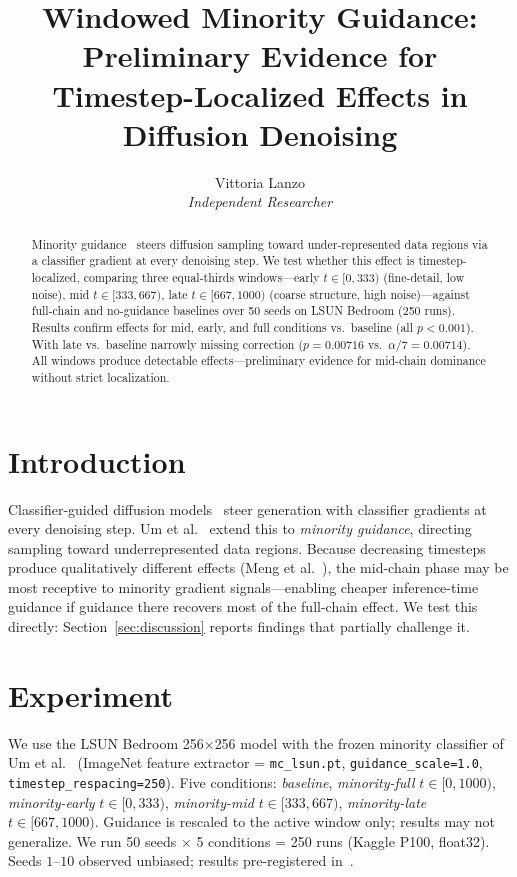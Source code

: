 \documentclass[10pt]{article}
\title{\textbf{Windowed Minority Guidance: Preliminary Evidence for
Timestep-Localized Effects in Diffusion Denoising}}
\author{%
  Vittoria Lanzo \\
  \textit{Independent Researcher}
}
\date{}
\begin{document}
\maketitle

\begin{abstract}
Minority guidance~\cite{um2024minority} steers diffusion sampling toward
under-represented data regions via a classifier gradient at every denoising
step.  We test whether this effect is timestep-localized, comparing three
equal-thirds windows---early $t\!\in\![0,333)$ (fine-detail, low noise),
mid $t\!\in\![333,667)$, late $t\!\in\![667,1000)$ (coarse structure, high
noise)---against full-chain and no-guidance baselines
over 50 seeds on LSUN Bedroom (250 runs).  Results confirm effects for mid,
early, and full conditions vs.\ baseline (all $p < 0.001$).  With late
vs.\ baseline narrowly missing correction ($p = 0.00716$ vs.\
$\alpha/7 = 0.00714$).  All windows produce detectable effects---preliminary
evidence for mid-chain dominance without strict localization.
\end{abstract}

\section{Introduction}
\label{sec:intro}

Classifier-guided diffusion models~\cite{dhariwal2021diffusion} steer generation
with classifier gradients at every denoising step.  Um et al.\ \cite{um2024minority}
extend this to \emph{minority guidance}, directing sampling toward underrepresented
data regions.  Because decreasing timesteps produce qualitatively different effects
(Meng et al.\ \cite{meng2022sdedit}), the mid-chain phase may be most receptive to
minority gradient signals---enabling cheaper inference-time guidance if guidance
there recovers most of the full-chain effect.  We test this directly: Section~\ref{sec:discussion}
reports findings that partially challenge it.

\section{Experiment}
\label{sec:experiment}

We use the LSUN Bedroom 256$\times$256 model with the frozen minority classifier of
Um et al.~\cite{um2024minority} (ImageNet feature extractor =
\texttt{mc\_lsun.pt}, \texttt{guidance\_scale=1.0},
\texttt{timestep\_respacing=250}).  Five conditions: \emph{baseline},
\emph{minority-full} $t\!\in\![0,1000)$, \emph{minority-early} $t\!\in\![0,333)$,
\emph{minority-mid} $t\!\in\![333,667)$, \emph{minority-late} $t\!\in\![667,1000)$.
Guidance is rescaled to the active window only; results may not
generalize.  We run 50 seeds $\times$ 5 conditions = 250 runs (Kaggle P100,
float32).  Seeds $1$--$10$ observed unbiased; results pre-registered in~\cite{um2024minority}.
\end{document}
